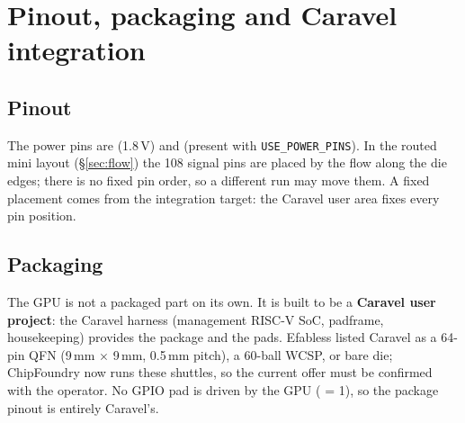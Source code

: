 \documentclass[10pt,a4paper]{report}
\newcommand{\sig}[1]{\texttt{\detokenize{#1}}}
\begin{document}
\section{Pinout, packaging and Caravel integration}\label{sec:caravel}
\subsection{Pinout}
The power pins are \sig{vccd1} (1.8\,V) and \sig{vssd1} (present with \texttt{USE\_POWER\_PINS}). In the routed mini layout
(\S\ref{sec:flow}) the 108 signal pins are placed by the flow along the die edges; there is no fixed pin order, so a different
run may move them. A fixed placement comes from the integration target: the Caravel user area fixes every pin position.

\subsection{Packaging}
The GPU is not a packaged part on its own. It is built to be a \textbf{Caravel user project}: the Caravel harness (management RISC-V
SoC, padframe, housekeeping) provides the package and the pads. Efabless listed Caravel as a 64-pin QFN (9\,mm $\times$ 9\,mm,
0.5\,mm pitch), a 60-ball WCSP, or bare die; ChipFoundry now runs these shuttles, so the current offer must be confirmed with the operator.
No GPIO pad is driven by the GPU (\sig{io_oeb} = 1), so the package pinout is entirely Caravel's.
\end{document}
